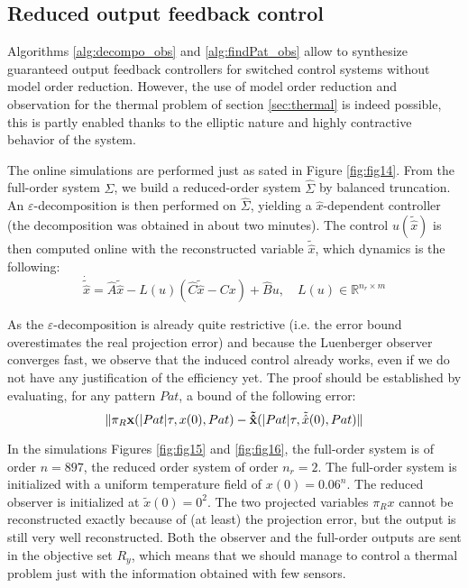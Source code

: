 \subsection{Reduced output feedback control}

Algorithms \ref{alg:decompo_obs} and \ref{alg:findPat_obs} allow to synthesize guaranteed output
feedback controllers for switched control systems without model order reduction.
However, the use of model order reduction and observation
for the thermal problem of section \ref{sec:thermal} is indeed possible, this is partly 
enabled thanks to the elliptic nature and highly contractive behavior of the system.

The online simulations are performed just as sated in Figure \ref{fig:fig14}.
From the full-order system $\Sigma$, we build a reduced-order system $\hat \Sigma$ by balanced
truncation. An $\varepsilon$-decomposition is then performed on $\hat \Sigma$, 
yielding a $\hat x$-dependent controller (the decomposition was obtained in
about two minutes). The control $u(\tilde{\hat x})$ is then computed online with the 
reconstructed variable $\tilde {\hat x}$, which dynamics is the following:
\begin{equation}
 \dot {\tilde {\hat x}} = \hat A \tilde {\hat x} - L(u)(\hat C \tilde{\hat x} - C x) + \hat B u, \quad L(u) \in \mathbb{R}^{n_r\times m}
\label{eq:luenberger_red}
 \end{equation}


As the $\varepsilon$-decomposition is
already quite restrictive (i.e. the error bound overestimates the real
projection error) and because the Luenberger observer converges fast,
we observe that the induced control already works, even if we do not have any 
justification of the efficiency yet. The proof should be established
by evaluating, for any pattern $Pat$, a bound of the following error:
\begin{equation}
   \Vert \pi_R {\bf x}(\vert Pat\vert \tau ,x(0),Pat) - {\bf {\tilde {\hat x}}}(\vert Pat\vert \tau ,\tilde {\hat x}(0),Pat) \Vert
 \label{eq:to_proof}
\end{equation}


In the simulations Figures \ref{fig:fig15} and \ref{fig:fig16}, the full-order system is 
of order $n=897$, the reduced order system of order $n_r = 2$. The full-order system
is initialized with a uniform temperature field of $x(0) = 0.06^{n}$. The reduced observer is initialized
at $\tilde{x}(0) = 0^2$.
The two projected variables $\pi_R x$ cannot be reconstructed exactly because of (at least) the
projection error, but the output is still very well reconstructed. 
Both the observer and the full-order outputs are sent in the objective set $R_y$, which means
that we should manage to control a thermal problem just with the information
obtained with few sensors.

